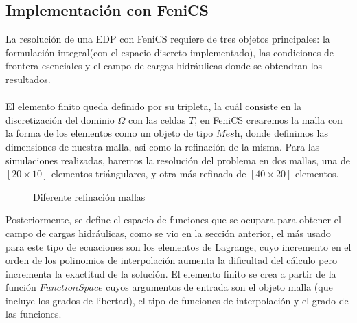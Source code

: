 \subsection{Implementación con FeniCS}

La resolución de una EDP con FeniCS requiere de tres objetos principales: la formulación integral(con el espacio discreto implementado), las condiciones de frontera esenciales y el campo de cargas hidráulicas donde se obtendran los resultados.
\\
\\
El elemento finito queda definido por su tripleta, la cuál consiste en la discretización del dominio $\Omega$ con las celdas $T$, en FeniCS crearemos la malla con la forma de los elementos como un objeto de tipo $\textit{Mesh}$, donde definimos las dimensiones de nuestra malla, asi como la refinación de la misma. Para las simulaciones realizadas, haremos la resolución del problema en dos mallas, una de $[20{\times}10]$ elementos triángulares, y otra más refinada de $[40{\times}20]$ elementos.
\\

\begin{figure}[htbp]
\centering
{}
\caption{Diferente refinación mallas}
 \label{Figura19:2}
\end{figure}

Posteriormente, se define el espacio de funciones que se ocupara para obtener el campo de cargas hidráulicas, como se vio en la sección anterior, el más usado para este tipo de ecuaciones son los elementos de Lagrange, cuyo incremento en el orden de los polinomios de interpolación aumenta la dificultad del cálculo pero incrementa la exactitud de la solución. El elemento finito se crea a partir de la función $\textit{FunctionSpace}$ cuyos argumentos de entrada son el objeto malla (que incluye los grados de libertad), el tipo de funciones de interpolación y el grado de las funciones.

